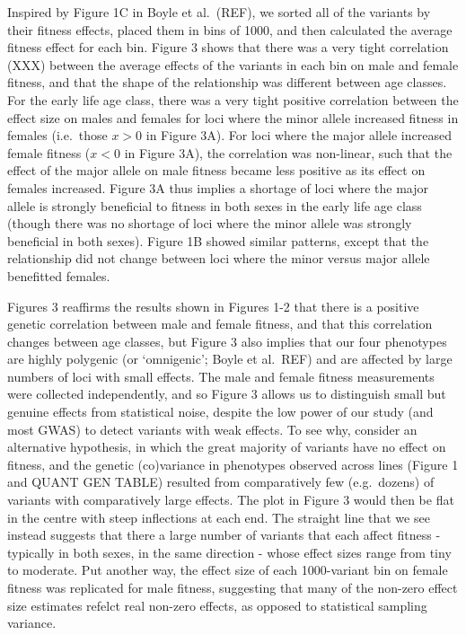 \documentclass{article}
\begin{document}
Inspired by Figure 1C in Boyle et al.~(REF), we sorted all of the
variants by their fitness effects, placed them in bins of 1000, and then
calculated the average fitness effect for each bin. Figure 3 shows that
there was a very tight correlation (XXX) between the average effects of
the variants in each bin on male and female fitness, and that the shape
of the relationship was different between age classes. For the early
life age class, there was a very tight positive correlation between the
effect size on males and females for loci where the minor allele
increased fitness in females (i.e.~those \(x > 0\) in Figure 3A). For
loci where the major allele increased female fitness (\(x < 0\) in
Figure 3A), the correlation was non-linear, such that the effect of the
major allele on male fitness became less positive as its effect on
females increased. Figure 3A thus implies a shortage of loci where the
major allele is strongly beneficial to fitness in both sexes in the
early life age class (though there was no shortage of loci where the
minor allele was strongly beneficial in both sexes). Figure 1B showed
similar patterns, except that the relationship did not change between
loci where the minor versus major allele benefitted females.

Figures 3 reaffirms the results shown in Figures 1-2 that there is a
positive genetic correlation between male and female fitness, and that
this correlation changes between age classes, but Figure 3 also implies
that our four phenotypes are highly polygenic (or `omnigenic'; Boyle et
al.~REF) and are affected by large numbers of loci with small effects.
The male and female fitness measurements were collected independently,
and so Figure 3 allows us to distinguish small but genuine effects from
statistical noise, despite the low power of our study (and most GWAS) to
detect variants with weak effects. To see why, consider an alternative
hypothesis, in which the great majority of variants have no effect on
fitness, and the genetic (co)variance in phenotypes observed across
lines (Figure 1 and QUANT GEN TABLE) resulted from comparatively few
(e.g.~dozens) of variants with comparatively large effects. The plot in
Figure 3 would then be flat in the centre with steep inflections at each
end. The straight line that we see instead suggests that there a large
number of variants that each affect fitness - typically in both sexes,
in the same direction - whose effect sizes range from tiny to moderate.
Put another way, the effect size of each 1000-variant bin on female
fitness was replicated for male fitness, suggesting that many of the
non-zero effect size estimates refelct real non-zero effects, as opposed
to statistical sampling variance.
\end{document}
